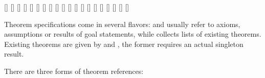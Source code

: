 \begin{isabellebody}
\begin{isamarkuptext}
  \begin{railoutput}
\rail@bar
{}[]
[]
[]
[]
[]
[]
[]
\rail@endbar
\rail@end
{}
\rail@bar
{}[]
[]
[]
[]
[]
[]
[]
\rail@endbar
\rail@end
{}
\rail@plus
{}
[]
\rail@endplus
\rail@end
{}
[]
\rail@bar
{}
\rail@plus
{}[]
[]
[]
\rail@endplus
\rail@endbar
{}[]
\rail@end
\end{railoutput}


  Theorem specifications come in several flavors: \hyperlink{syntax.axmdecl}{\mbox{}}
  and \hyperlink{syntax.thmdecl}{\mbox{}} usually refer to axioms, assumptions or
  results of goal statements, while \hyperlink{syntax.thmdef}{\mbox{}} collects lists of
  existing theorems.  Existing theorems are given by \hyperlink{syntax.thmref}{\mbox{}}
  and \hyperlink{syntax.thmrefs}{\mbox{}}, the former requires an actual singleton
  result.

  There are three forms of theorem references:
  \begin{enumerate}
  

\end{enumerate}
\end{isamarkuptext}
\end{isabellebody}
